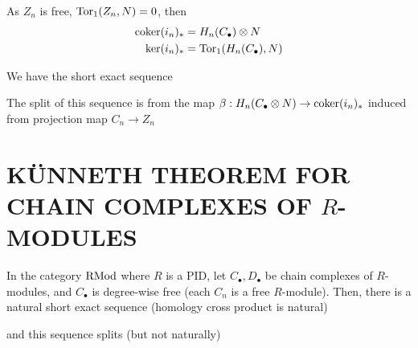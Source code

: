 \begin{longproof}
	As $Z_n$ is free, $\operatorname{Tor}_1(Z_n, N) = 0$,  then 
	\begin{align*}
		\operatorname{coker}(i_n)_* &= H_n(C_\bullet) \otimes N \\
		\ker (i_n)_* &= \operatorname{Tor}_1(H_n(C_\bullet), N)
	\end{align*}
	
	We have the short exact sequence
	
	\begin{center}
	\end{center}
	
	The split of this sequence is from the map $\beta: H_n(C_\bullet \otimes N) \to \operatorname{coker}(i_n)_*$ induced from projection map $C_n \to Z_n$
\end{longproof}










\section{KÜNNETH THEOREM FOR CHAIN COMPLEXES OF $R$-MODULES}

\begin{theorem}
	In the category $\operatorname{RMod}$ where $R$ is a PID, let $C_\bullet, D_\bullet$ be chain complexes of $R$-modules, and $C_\bullet$ is degree-wise free (each $C_n$ is a free $R$-module). Then, there is a natural short exact sequence (homology cross product is natural)
	\begin{center}
	\end{center}
	and this sequence splits (but not naturally)
\end{theorem}

